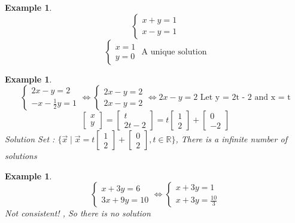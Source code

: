 \documentclass{article}
\newtheorem{ex}[theorem]{Example}
\begin{document}
\begin{ex}
\[\begin{cases} x + y = 1 \\ x - y = 1 \end{cases} \]
\[\begin{cases} x = 1 \\ y = 0 \end{cases}  \text{ A unique solution} \]
\end{ex}

\begin{ex}
\[\begin{cases} 2x - y = 2 \\ -x - \frac{1}{2}y = 1 \end{cases} \iff \begin{cases} 2x -  y = 2 \\ 2x - y = 2 \end{cases} \iff 2x - y = 2 \text{ Let y = 2t - 2 and x = t}\]
\[\begin{bmatrix} x \\ y \end{bmatrix} = \begin{bmatrix} t \\ 2t-2 \end{bmatrix}  = t \begin{bmatrix} 1 \\ 2 \end{bmatrix} + \begin{bmatrix} 0 \\ -2 \end{bmatrix}\]
Solution Set : \( \{ \vec{x} \mid \vec{x} = t \begin{bmatrix} 1 \\ 2 \end{bmatrix} + \begin{bmatrix} 0 \\ 2  \end{bmatrix} , t \in \mathbb{R} \} \),  There is a infinite number of solutions 
\end{ex}

\begin{ex}
\[\begin{cases} x + 3y = 6 \\ 3x + 9y = 10 \end{cases} \iff  \begin{cases} x + 3y = 1 \\ x + 3y = \frac{10}{3} \end{cases} \] 
Not consistent! , So there is no solution
\end{ex}
\end{document}
